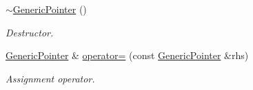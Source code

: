 \begin{Indent}
\begin{DoxyCompactItemize}
\mbox{\label{class_generic_pointer_acf3eb2f7c4ebf9256f638aafa17534cb}} 
\hyperlink{class_generic_pointer_acf3eb2f7c4ebf9256f638aafa17534cb}{$\sim$\+Generic\+Pointer} ()
\begin{DoxyCompactList}\small\item\em Destructor. \end{DoxyCompactList}\item 
\mbox{\label{class_generic_pointer_a1d0174a6e72daa4024da9e08ce1e7951}} 
\hyperlink{class_generic_pointer}{Generic\+Pointer} \& \hyperlink{class_generic_pointer_a1d0174a6e72daa4024da9e08ce1e7951}{operator=} (const \hyperlink{class_generic_pointer}{Generic\+Pointer} \&rhs)
\begin{DoxyCompactList}\small\item\em Assignment operator. \end{DoxyCompactList}\end{DoxyCompactItemize}
\end{Indent}
